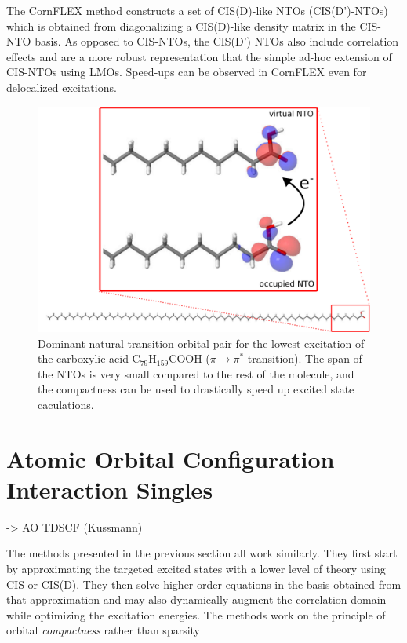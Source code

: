 The CornFLEX method constructs a set of CIS(D)-like NTOs (CIS(D')-NTOs) which is obtained from diagonalizing a CIS(D)-like density matrix in the CIS-NTO basis. As opposed to CIS-NTOs, the CIS(D') NTOs also include correlation effects and are a more robust representation that the simple ad-hoc extension of CIS-NTOs using LMOs. Speed-ups can be observed in CornFLEX even for delocalized excitations.


\begin{figure}
\centering
\includegraphics[scale=0.6]{Pics/NTOACID}
\caption{Dominant natural transition orbital pair for the lowest excitation of the carboxylic acid C$_{79}$H$_{159}$COOH ($\pi \rightarrow \pi^*$ transition). The span of the NTOs is very small compared to the rest of the molecule, and the compactness can be used to drastically speed up excited state caculations. }
\end{figure}

\section{Atomic Orbital Configuration Interaction Singles}

-> AO TDSCF (Kussmann)

The methods presented in the previous section all work similarly. They first start by approximating the targeted excited states with a lower level of theory using CIS or CIS(D). They then solve higher order equations in the basis obtained from that approximation and may also dynamically augment the correlation domain while optimizing the excitation energies. The methods work on the principle of orbital \emph{compactness} rather than sparsity

